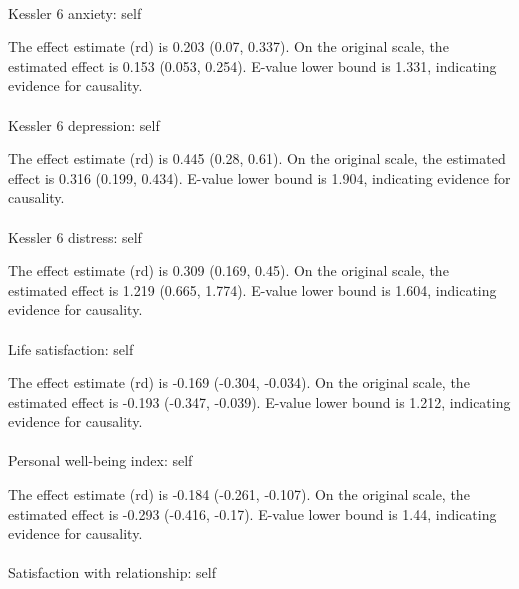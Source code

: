 \documentclass[
  single column]{article}
\makeatletter
\let\oldparagraph\paragraph
\renewcommand{\paragraph}{
    \@ifstar
      \xxxParagraphStar
      \xxxParagraphNoStar
  }
\newcommand{\xxxParagraphStar}[1]{\oldparagraph*{#1}\mbox{}}
\newcommand{\xxxParagraphNoStar}[1]{\oldparagraph{#1}\mbox{}}
\makeatother
\begin{document}
\paragraph{Kessler 6 anxiety: self}\label{kessler-6-anxiety-self-5}

The effect estimate (rd) is 0.203 (0.07, 0.337). On the original scale,
the estimated effect is 0.153 (0.053, 0.254). E-value lower bound is
1.331, indicating evidence for causality.

\paragraph{Kessler 6 depression:
self}\label{kessler-6-depression-self-6}

The effect estimate (rd) is 0.445 (0.28, 0.61). On the original scale,
the estimated effect is 0.316 (0.199, 0.434). E-value lower bound is
1.904, indicating evidence for causality.

\paragraph{Kessler 6 distress: self}\label{kessler-6-distress-self-5}

The effect estimate (rd) is 0.309 (0.169, 0.45). On the original scale,
the estimated effect is 1.219 (0.665, 1.774). E-value lower bound is
1.604, indicating evidence for causality.

\paragraph{Life satisfaction: self}\label{life-satisfaction-self-12}

The effect estimate (rd) is -0.169 (-0.304, -0.034). On the original
scale, the estimated effect is -0.193 (-0.347, -0.039). E-value lower
bound is 1.212, indicating evidence for causality.

\paragraph{Personal well-being index:
self}\label{personal-well-being-index-self-7}

The effect estimate (rd) is -0.184 (-0.261, -0.107). On the original
scale, the estimated effect is -0.293 (-0.416, -0.17). E-value lower
bound is 1.44, indicating evidence for causality.

\paragraph{Satisfaction with relationship:
self}\label{satisfaction-with-relationship-self-2}
\end{document}
